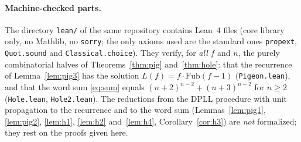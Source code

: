 \documentclass[11pt]{article}
\theoremstyle{definition}
\theoremstyle{remark}
\newcommand{\Fub}{\mathrm{Fub}}
\begin{document}
\paragraph{Machine-checked parts.} The directory \texttt{lean/} of the same repository contains Lean~4 files
(core library only, no Mathlib, no \texttt{sorry}; the only axioms used are the standard ones \texttt{propext},
\texttt{Quot.sound} and \texttt{Classical.choice}). They verify, for \emph{all} $f$ and $n$, the purely combinatorial
halves of Theorems~\ref{thm:pig} and~\ref{thm:hole}: that the recurrence of Lemma~\ref{lem:pig3} has the solution
$L(f)=f\cdot\Fub(f-1)$ (\texttt{Pigeon.lean}), and that the word sum \eqref{eq:sum} equals
$(n+2)^{n-2}+(n+3)^{n-2}$ for $n\ge2$ (\texttt{Hole.lean}, \texttt{Hole2.lean}). The reductions from the DPLL
procedure with unit propagation to the recurrence and to the word sum (Lemmas~\ref{lem:pig1}, \ref{lem:pig2},
\ref{lem:h1}, \ref{lem:h2} and~\ref{lem:h4}, Corollary~\ref{cor:h3}) are \emph{not} formalized; they rest on the proofs given here.
\end{document}
